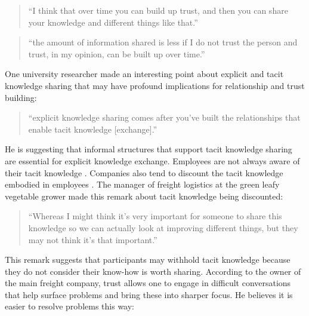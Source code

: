 \begin{quote}
\small
\enquote{I think that over time you can build up trust, and then you can share your knowledge and different things like that.} \\
\end{quote}

\begin{quote}
\small
\enquote{the amount of information shared is less if I do not trust the person and trust, in my opinion, can be built up over time.} \\
\end{quote}

One university researcher made an interesting point about explicit and tacit knowledge sharing that may have profound implications for relationship and trust building:

\begin{quote}
\small
\enquote{explicit knowledge sharing comes after you've built the relationships that enable tacit knowledge [exchange].} \\
\end{quote}

He is suggesting that informal structures that support tacit knowledge sharing are essential for explicit knowledge exchange. Employees are not always aware of their tacit knowledge \citep{polanyi1966tacit, horvath2000working}. Companies also tend to discount the tacit knowledge embodied in employees \citep{mcadam2007exploring}. The manager of freight logistics at the green leafy vegetable grower made this remark about tacit knowledge being discounted:

\begin{quote}
\small
\enquote{Whereas I might think it's very important for someone to share this knowledge so we can actually look at improving different things, but they may not think it's that important.} \\
\end{quote}

This remark suggests that participants may withhold tacit knowledge because they do not consider their know-how is worth sharing. According to the owner of the main freight company, trust allows one to engage in difficult conversations that help surface problems and bring these into sharper focus. He believes it is easier to resolve problems this way:   

